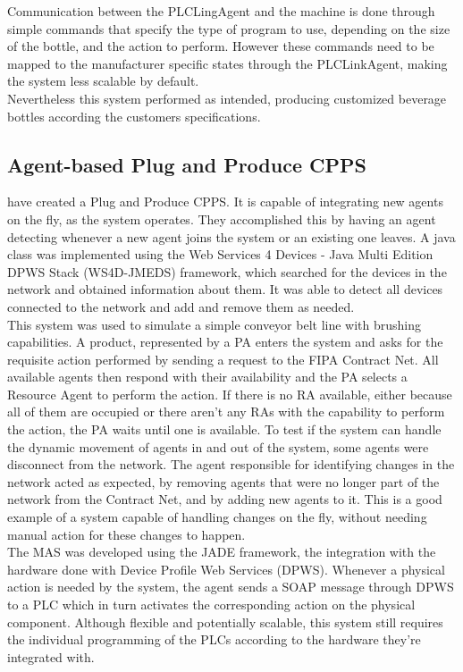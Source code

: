 Communication between the PLCLingAgent and the machine is done through simple commands that specify the type of program to use, depending on the size of the bottle, and the action to perform. However these commands need to be mapped to the manufacturer specific states through the PLCLinkAgent, making the system less scalable by default.\\

Nevertheless this system performed as intended, producing customized beverage bottles according the customers specifications.
 
\subsection{Agent-based Plug and Produce CPPS}

\citeauthor{8972169} \cite{8972169} have created a Plug and Produce CPPS. It is capable of integrating new agents on the fly, as the system operates. They accomplished this by having an agent detecting whenever a new agent joins the system or an existing one leaves. A java class was implemented using the Web Services 4 Devices - Java Multi Edition DPWS Stack (WS4D-JMEDS) framework, which searched for the devices in the network and obtained information about them. It was able to detect all devices connected to the network and add and remove them as needed.\\

This system was used to simulate a simple conveyor belt line with brushing capabilities. A product, represented by a PA enters the system and asks for the requisite action performed by sending a request to the FIPA Contract Net. All available agents then respond with their availability and the PA selects a Resource Agent to perform the action. If there is no RA available, either because all of them are occupied or there aren't any RAs with the capability to perform the action, the PA waits until one is available.
To test if the system can handle the dynamic movement of agents in and out of the system, some agents were disconnect from the network. The agent responsible for identifying changes in the network acted as expected, by removing agents that were no longer part of the network from the Contract Net, and by adding new agents to it.
This is a good example of a system capable of handling changes on the fly, without needing manual action for these changes to happen.\\

The MAS was developed using the JADE framework, the integration with the hardware done with Device Profile Web Services (DPWS). Whenever a physical action is needed by the system, the agent sends a SOAP message through DPWS to a PLC which in turn activates the corresponding action on the physical component. Although flexible and potentially scalable, this system still requires the individual programming of the PLCs according to the hardware they're integrated with.

